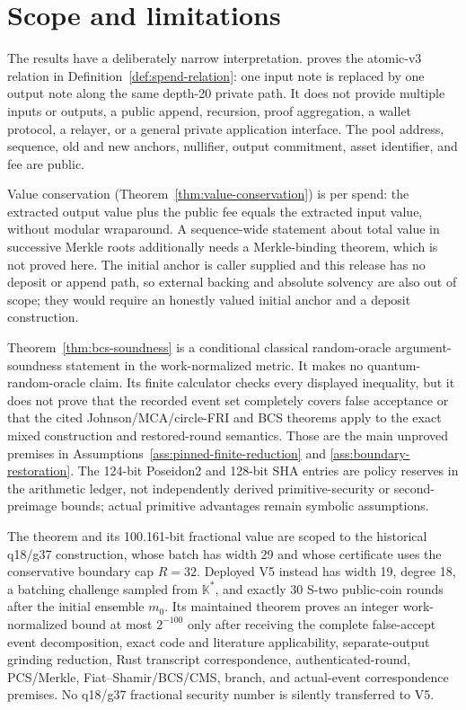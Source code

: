 \section{Scope and limitations}
\label{sec:limitations}

The results have a deliberately narrow interpretation.  \Profile{} proves the
atomic-v3 relation in Definition~\ref{def:spend-relation}: one input note
is replaced by one output note along the same depth-20 private path.  It does
not provide multiple inputs or outputs, a public append, recursion, proof
aggregation, a wallet protocol, a relayer, or a general private application
interface.  The pool address, sequence, old and new anchors, nullifier, output
commitment, asset identifier, and fee are public.

Value conservation (Theorem~\ref{thm:value-conservation}) is per spend: the
extracted output value plus the public fee equals the extracted input value,
without modular wraparound.  A sequence-wide statement about total value in
successive Merkle roots additionally needs a Merkle-binding theorem, which is
not proved here.  The initial anchor is caller supplied and this release has no
deposit or append path, so external backing and absolute solvency are also out
of scope; they would require an honestly valued initial anchor and a deposit
construction.

Theorem~\ref{thm:bcs-soundness} is a conditional classical random-oracle
argument-soundness statement in the work-normalized metric.  It makes no
quantum-random-oracle claim.  Its finite calculator checks every displayed
inequality, but it does not prove that the recorded event set completely
covers false acceptance or that the cited Johnson/MCA/circle-FRI and BCS
theorems apply to the exact mixed construction and restored-round semantics.
Those are the main unproved premises in
Assumptions~\ref{ass:pinned-finite-reduction} and
\ref{ass:boundary-restoration}.  The 124-bit Poseidon2 and 128-bit SHA entries
are policy reserves in the arithmetic ledger, not independently derived
primitive-security or second-preimage bounds; actual primitive advantages
remain symbolic assumptions.

The theorem and its 100.161-bit fractional value are scoped to the historical
q18/g37 construction, whose batch has width 29 and whose certificate uses the
conservative boundary cap \(R=32\).  Deployed V5 instead has width 19, degree
18, a batching challenge sampled from \(\mathbb K^*\), and exactly 30 S-two
public-coin rounds after the initial ensemble \(m_0\).  Its maintained theorem
proves an integer work-normalized bound at most \(2^{-100}\) only after
receiving the complete false-accept event decomposition, exact code and
literature applicability, separate-output grinding reduction, Rust transcript
correspondence, authenticated-round, PCS/Merkle, Fiat--Shamir/BCS/CMS, branch,
and actual-event correspondence premises.  No q18/g37 fractional security
number is silently transferred to V5.

